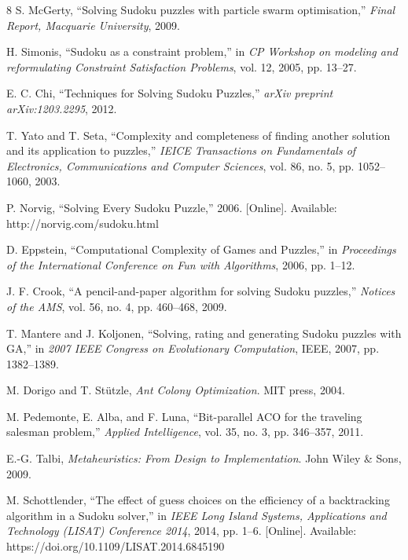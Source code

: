 \documentclass[runningheads]{llncs}
\begin{document}
\begin{thebibliography}{8}
    S. McGerty, ``Solving Sudoku puzzles with particle swarm optimisation,'' \emph{Final Report, Macquarie University}, 2009.

    H. Simonis, ``Sudoku as a constraint problem,'' in \emph{CP Workshop on modeling and reformulating Constraint Satisfaction Problems}, vol. 12, 2005, pp. 13--27.

    E. C. Chi, ``Techniques for Solving Sudoku Puzzles,'' \emph{arXiv preprint arXiv:1203.2295}, 2012.

    T. Yato and T. Seta, ``Complexity and completeness of finding another solution and its application to puzzles,'' \emph{IEICE Transactions on Fundamentals of Electronics, Communications and Computer Sciences}, vol. 86, no. 5, pp. 1052--1060, 2003.

    P. Norvig, ``Solving Every Sudoku Puzzle,'' 2006. [Online]. Available: http://norvig.com/sudoku.html

    D. Eppstein, ``Computational Complexity of Games and Puzzles,'' in \emph{Proceedings of the International Conference on Fun with Algorithms}, 2006, pp. 1--12.

    J. F. Crook, ``A pencil-and-paper algorithm for solving Sudoku puzzles,'' \emph{Notices of the AMS}, vol. 56, no. 4, pp. 460--468, 2009.

    T. Mantere and J. Koljonen, ``Solving, rating and generating Sudoku puzzles with GA,'' in \emph{2007 IEEE Congress on Evolutionary Computation}, IEEE, 2007, pp. 1382--1389.

    M. Dorigo and T. St\"{u}tzle, \emph{Ant Colony Optimization}. MIT press, 2004.

    M. Pedemonte, E. Alba, and F. Luna, ``Bit-parallel ACO for the traveling salesman problem,'' \emph{Applied Intelligence}, vol. 35, no. 3, pp. 346--357, 2011.

    E.-G. Talbi, \emph{Metaheuristics: From Design to Implementation}. John Wiley \& Sons, 2009.

    M. Schottlender, ``The effect of guess choices on the efficiency of a backtracking algorithm in a Sudoku solver,'' in \emph{IEEE Long Island Systems, Applications and Technology (LISAT) Conference 2014}, 2014, pp. 1--6. [Online]. Available: https://doi.org/10.1109/LISAT.2014.6845190


\end{thebibliography}
\end{document}
